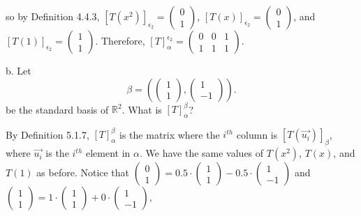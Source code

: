 \documentclass[12pt]{article}
\newenvironment{problem}[2][Problem]
{
	\begin{trivlist} 
		\item[\hskip \labelsep {\bfseries #1 #2:}]
	}
{
	\end{trivlist}
	}
\newenvironment{solution}[1][Solution]
{
	\begin{trivlist} 
		\item[\hskip \labelsep {\itshape #1:}]
	}
	{
	\end{trivlist}
}
\begin{document}
\begin{problem}{1}
\begin{solution}
so by Definition 4.4.3,
$[T(x^2)]_{\epsilon_2} = \begin{pmatrix}0\\1 \end{pmatrix}$, 
$[T(x)]_{\epsilon_2}=\begin{pmatrix} 0\\1 \end{pmatrix}$, and
$[T(1)]_{\epsilon_2}=\begin{pmatrix}1\\1 \end{pmatrix}$.
Therefore,
$[T]_\alpha ^{\epsilon_2}= \begin{pmatrix} 0&0&1\\1&1&1 \end{pmatrix}$.
\end{solution}
%
\noindent
\newline
\newline
b. Let
\[
\beta = \left( \begin{pmatrix} 1\\1 \end{pmatrix}, \begin{pmatrix} 1\\-1 \end{pmatrix} \right) \text{.}
\]
be the standard basis of $\mathbb{R}^2$. What is $[T]^\beta _\alpha$?
\begin{solution}
By Definition 5.1.7, $[T]^\beta _\alpha$ is the matrix where the $i^{th}$ column is $[T(\vec{u_i})]_\beta$, where $\vec{u_i}$ is the $i^{th}$ element in $\alpha$. We have the same values of $T(x^2)$, $T(x)$, and $T(1)$ as before. Notice that
$\begin{pmatrix}0\\1\end{pmatrix} = 0.5 \cdot \begin{pmatrix}1\\1\end{pmatrix} - 0.5\cdot \begin{pmatrix}1\\-1\end{pmatrix}$ and 
$\begin{pmatrix}1\\1\end{pmatrix} = 1 \cdot \begin{pmatrix}1\\1\end{pmatrix} + 0\cdot \begin{pmatrix}1\\-1\end{pmatrix} \text{,}$

\end{solution}
\end{problem}
\end{document}

